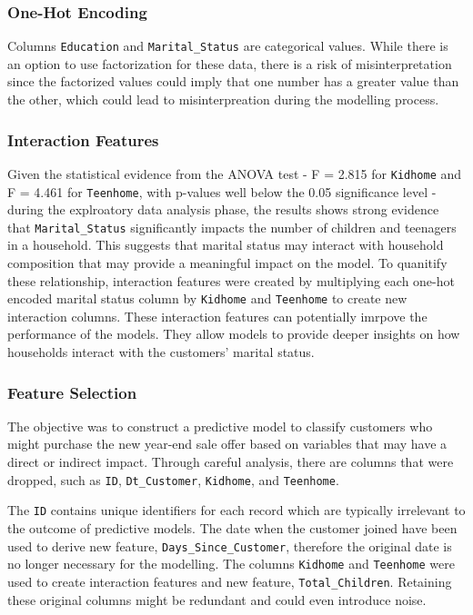 \subsubsection{One-Hot Encoding}

Columns \texttt{Education} and \texttt{Marital\_Status} are categorical values. While there is an option to use factorization for these data, there is a risk of misinterpretation since the factorized values could imply that one number has a greater value than the other, which could lead to misinterpreation during the modelling process. 

\subsubsection{Interaction Features}

Given the statistical evidence from the ANOVA test - F = 2.815 for \texttt{Kidhome} and F = 4.461 for \texttt{Teenhome}, with p-values well below the 0.05 significance level - during the explroatory data analysis phase, the results shows strong evidence that \texttt{Marital\_Status} significantly impacts the number of children and teenagers in a household. This suggests that marital status may interact with household composition that may provide a meaningful impact on the model. To quanitify these relationship, interaction features were created by multiplying each one-hot encoded marital status column by \texttt{Kidhome} and \texttt{Teenhome} to create new interaction columns. These interaction features can potentially imrpove the performance of the models. They allow models to provide deeper insights on how households interact with the customers' marital status.

\subsubsection{Feature Selection}

The objective was to construct a predictive model to classify customers who might purchase the new year-end sale offer based on variables that may have a direct or indirect impact. Through careful analysis, there are columns that were dropped, such as \texttt{ID}, \texttt{Dt\_Customer}, \texttt{Kidhome}, and \texttt{Teenhome}. 

The \texttt{ID} contains unique identifiers for each record which are typically irrelevant to the outcome of predictive models. The date when the customer joined have been used to derive new feature, \texttt{Days\_Since\_Customer}, therefore the original date is no longer necessary for the modelling. The columns \texttt{Kidhome} and \texttt{Teenhome} were used to create interaction features and new feature, \texttt{Total\_Children}. Retaining these original columns might be redundant and could even introduce noise.

